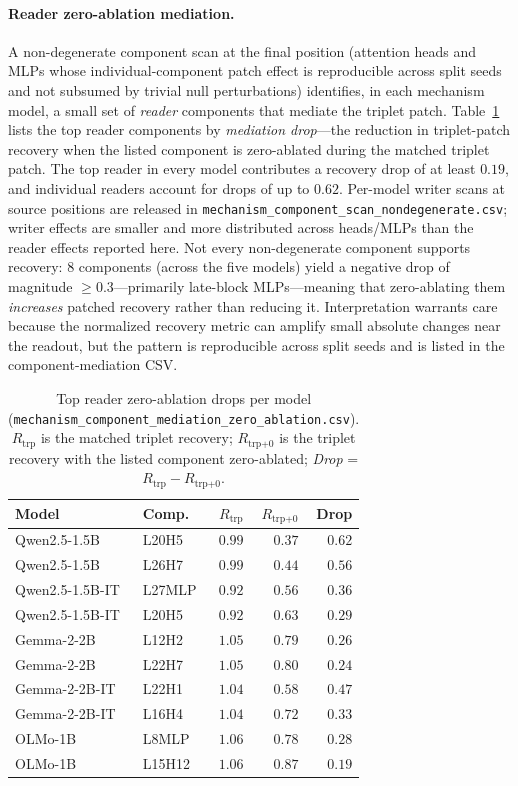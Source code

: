 \documentclass[11pt]{article}
\begin{document}
\paragraph{Reader zero-ablation mediation.}
A non-degenerate component scan at the final position (attention heads and MLPs whose
individual-component patch effect is reproducible across split seeds and not subsumed by
trivial null perturbations) identifies, in each mechanism model, a small set of \emph{reader}
components that mediate the triplet patch. Table~\ref{tab:mediation} lists the top reader
components by \emph{mediation drop}---the reduction in triplet-patch recovery when the listed
component is zero-ablated during the matched triplet patch. The top reader in every model
contributes a recovery drop of at least $0.19$, and individual readers account for drops of
up to $0.62$. Per-model writer scans at source positions are released in
\texttt{mechanism\_component\_scan\_\allowbreak nondegenerate.csv}; writer effects are smaller
and more distributed across heads/MLPs than the reader effects reported here.
Not every non-degenerate component supports recovery: $8$ components (across the five models)
yield a negative drop of magnitude $\geq 0.3$---primarily late-block MLPs---meaning that
zero-ablating them \emph{increases} patched recovery rather than reducing it. Interpretation
warrants care because the normalized recovery metric can amplify small absolute changes near
the readout, but the pattern is reproducible across split seeds and is listed in the
component-mediation CSV.

\begin{table}[H]
\centering
\footnotesize
\begin{tabular*}{\columnwidth}{@{\extracolsep{\fill}}llrrr@{}}
\toprule
Model & Comp. & $R_{\text{trp}}$ & $R_{\text{trp+0}}$ & Drop \\
\midrule
Qwen2.5-1.5B    & L20H5  & $0.99$ & $0.37$ & $0.62$ \\
Qwen2.5-1.5B    & L26H7  & $0.99$ & $0.44$ & $0.56$ \\
Qwen2.5-1.5B-IT & L27MLP & $0.92$ & $0.56$ & $0.36$ \\
Qwen2.5-1.5B-IT & L20H5  & $0.92$ & $0.63$ & $0.29$ \\
Gemma-2-2B      & L12H2  & $1.05$ & $0.79$ & $0.26$ \\
Gemma-2-2B      & L22H7  & $1.05$ & $0.80$ & $0.24$ \\
Gemma-2-2B-IT   & L22H1  & $1.04$ & $0.58$ & $0.47$ \\
Gemma-2-2B-IT   & L16H4  & $1.04$ & $0.72$ & $0.33$ \\
OLMo-1B         & L8MLP  & $1.06$ & $0.78$ & $0.28$ \\
OLMo-1B         & L15H12 & $1.06$ & $0.87$ & $0.19$ \\
\bottomrule
\end{tabular*}
\caption{Top reader zero-ablation drops per model
(\texttt{mechanism\_component\_mediation\_\allowbreak zero\_ablation.csv}). $R_{\text{trp}}$ is
the matched triplet recovery; $R_{\text{trp+0}}$ is the triplet recovery with the listed
component zero-ablated; \emph{Drop} = $R_{\text{trp}} - R_{\text{trp+0}}$.}
\label{tab:mediation}
\end{table}
\end{document}

